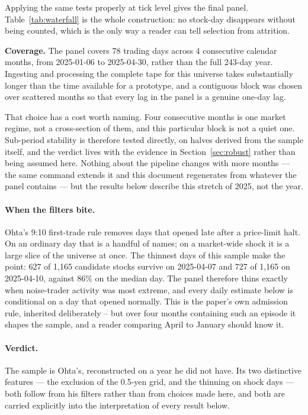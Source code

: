 Applying the same tests properly at tick level gives the final panel.
Table~\ref{tab:waterfall} is the whole construction: no stock-day disappears
without being counted, which is the only way a reader can tell selection from
attrition.



\textbf{Coverage.} The panel covers 78 trading days across 4 consecutive calendar months, from 2025-01-06 to 2025-04-30, rather than the full 243-day year. Ingesting and processing the complete tape for this universe takes substantially longer than the time available for a prototype, and a contiguous block was chosen over scattered months so that every lag in the panel is a genuine one-day lag.

That choice has a cost worth naming. Four consecutive months is one market regime, not a cross-section of them, and this particular block is not a quiet one. Sub-period stability is therefore tested directly, on halves derived from the sample itself, and the verdict lives with the evidence in Section~\ref{sec:robust} rather than being assumed here. Nothing about the pipeline changes with more months --- the same command extends it and this document regenerates from whatever the panel contains --- but the results below describe this stretch of 2025, not the year.

\paragraph{When the filters bite.} Ohta's 9:10 first-trade rule removes days that opened late after a price-limit halt. On an ordinary day that is a handful of names; on a market-wide shock it is a large slice of the universe at once. The thinnest days of this sample make the point: 627 of 1,165 candidate stocks survive on 2025-04-07 and 727 of 1,165 on 2025-04-10, against 86\% on the median day. The panel therefore thins exactly when noise-trader activity was most extreme, and every daily estimate below is conditional on a day that opened normally. This is the paper's own admission rule, inherited deliberately -- but over four months containing such an episode it shapes the sample, and a reader comparing April to January should know it.

\paragraph{Verdict.}
The sample is Ohta's, reconstructed on a year he did not have. Its two
distinctive features --- the exclusion of the 0.5-yen grid, and the thinning on
shock days --- both follow from his filters rather than from choices made here,
and both are carried explicitly into the interpretation of every result below.

